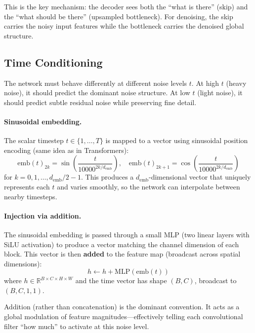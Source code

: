 \documentclass[11pt]{article}
\begin{document}
This is the key mechanism: the decoder sees both the ``what is there'' (skip)
and the ``what should be there'' (upsampled bottleneck). For denoising, the skip
carries the noisy input features while the bottleneck carries the denoised
global structure.

\subsection{Time Conditioning}

The network must behave differently at different noise levels $t$. At high $t$
(heavy noise), it should predict the dominant noise structure. At low $t$
(light noise), it should predict subtle residual noise while preserving fine detail.

\paragraph{Sinusoidal embedding.}
The scalar timestep $t \in \{1, \ldots, T\}$ is mapped to a vector using
sinusoidal position encoding (same idea as in Transformers):
\begin{equation}
    \text{emb}(t)_{2k} = \sin\!\left(\frac{t}{10000^{2k/d_{\text{emb}}}}\right),
    \quad
    \text{emb}(t)_{2k+1} = \cos\!\left(\frac{t}{10000^{2k/d_{\text{emb}}}}\right)
\end{equation}
for $k = 0, 1, \ldots, d_{\text{emb}}/2 - 1$. This produces a $d_{\text{emb}}$-dimensional
vector that uniquely represents each $t$ and varies smoothly, so the network can
interpolate between nearby timesteps.

\paragraph{Injection via addition.}
The sinusoidal embedding is passed through a small MLP (two linear layers with
SiLU activation) to produce a vector matching the channel dimension of each block.
This vector is then \textbf{added} to the feature map (broadcast across spatial
dimensions):
\begin{equation}
    h \leftarrow h + \text{MLP}(\text{emb}(t))
\end{equation}
where $h \in \mathbb{R}^{B \times C \times H \times W}$ and the time vector
has shape $(B, C)$, broadcast to $(B, C, 1, 1)$.

Addition (rather than concatenation) is the dominant convention. It acts as a
global modulation of feature magnitudes---effectively telling each convolutional
filter ``how much'' to activate at this noise level.
\end{document}

